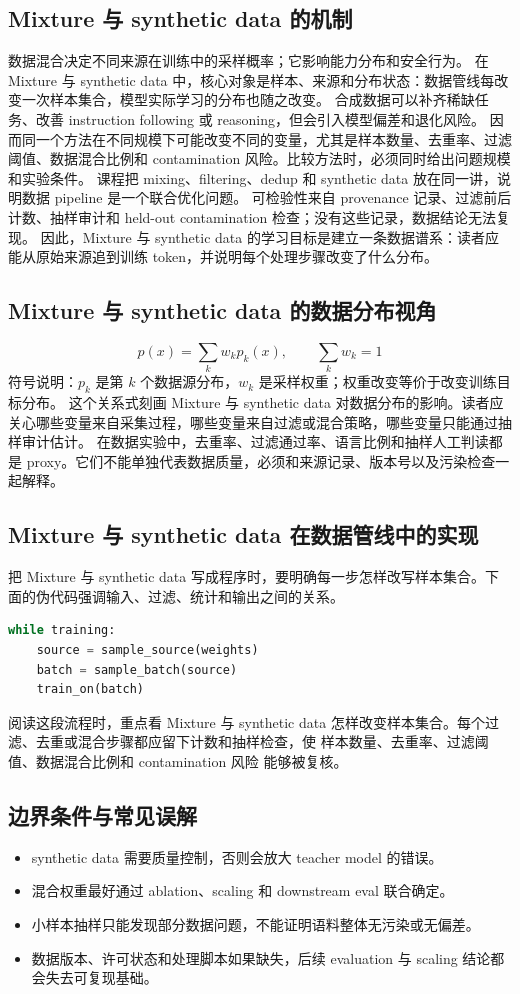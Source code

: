 \documentclass[a4paper]{article}
\begin{document}
\subsection{Mixture 与 synthetic data 的机制}
数据混合决定不同来源在训练中的采样概率；它影响能力分布和安全行为。 在 Mixture 与 synthetic data 中，核心对象是样本、来源和分布状态：数据管线每改变一次样本集合，模型实际学习的分布也随之改变。
合成数据可以补齐稀缺任务、改善 instruction following 或 reasoning，但会引入模型偏差和退化风险。 因而同一个方法在不同规模下可能改变不同的变量，尤其是样本数量、去重率、过滤阈值、数据混合比例和 contamination 风险。比较方法时，必须同时给出问题规模和实验条件。
课程把 mixing、filtering、dedup 和 synthetic data 放在同一讲，说明数据 pipeline 是一个联合优化问题。 可检验性来自 provenance 记录、过滤前后计数、抽样审计和 held-out contamination 检查；没有这些记录，数据结论无法复现。
因此，Mixture 与 synthetic data 的学习目标是建立一条数据谱系：读者应能从原始来源追到训练 token，并说明每个处理步骤改变了什么分布。
\subsection{Mixture 与 synthetic data 的数据分布视角}
\[p(x)=\sum_k w_k p_k(x),\qquad \sum_k w_k=1\]
符号说明：\(p_k\) 是第 \(k\) 个数据源分布，\(w_k\) 是采样权重；权重改变等价于改变训练目标分布。
这个关系式刻画 Mixture 与 synthetic data 对数据分布的影响。读者应关心哪些变量来自采集过程，哪些变量来自过滤或混合策略，哪些变量只能通过抽样审计估计。
在数据实验中，去重率、过滤通过率、语言比例和抽样人工判读都是 proxy。它们不能单独代表数据质量，必须和来源记录、版本号以及污染检查一起解释。
\subsection{Mixture 与 synthetic data 在数据管线中的实现}
把 Mixture 与 synthetic data 写成程序时，要明确每一步怎样改写样本集合。下面的伪代码强调输入、过滤、统计和输出之间的关系。
\begin{lstlisting}[language=Python]
while training:
    source = sample_source(weights)
    batch = sample_batch(source)
    train_on(batch)
\end{lstlisting}
阅读这段流程时，重点看 Mixture 与 synthetic data 怎样改变样本集合。每个过滤、去重或混合步骤都应留下计数和抽样检查，使 样本数量、去重率、过滤阈值、数据混合比例和 contamination 风险 能够被复核。
\subsection{边界条件与常见误解}
\begin{itemize}
\item synthetic data 需要质量控制，否则会放大 teacher model 的错误。
\item 混合权重最好通过 ablation、scaling 和 downstream eval 联合确定。
\item 小样本抽样只能发现部分数据问题，不能证明语料整体无污染或无偏差。
\item 数据版本、许可状态和处理脚本如果缺失，后续 evaluation 与 scaling 结论都会失去可复现基础。
\end{itemize}
\end{document}
